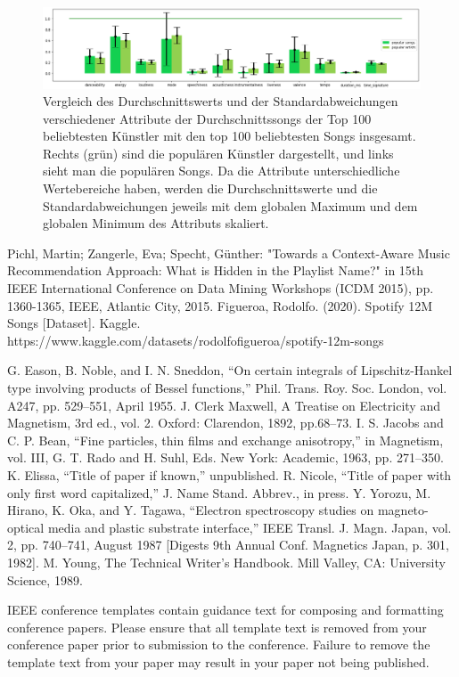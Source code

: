 \documentclass[conference]{IEEEtran}
\begin{document}
\begin{figure}[t]
\centering
\includegraphics[width=\textwidth]{images/tracks_arts.png}
\caption{Vergleich des Durchschnittswerts und der Standardabweichungen verschiedener Attribute der Durchschnittssongs der Top 100 beliebtesten Künstler mit den top 100 beliebtesten Songs insgesamt. Rechts (grün) sind die populären Künstler dargestellt, und links sieht man die populären Songs. Da die Attribute unterschiedliche Wertebereiche haben, werden die Durchschnittswerte und die Standardabweichungen jeweils mit dem globalen Maximum und dem globalen Minimum des Attributs skaliert.}
\label{popular artists vs popular songs}
\end{figure}


\begin{thebibliography}{00}
 Pichl, Martin; Zangerle, Eva; Specht, Günther: "Towards a Context-Aware Music Recommendation Approach: What is Hidden in the Playlist Name?" in 15th IEEE International Conference on Data Mining Workshops (ICDM 2015), pp. 1360-1365, IEEE, Atlantic City, 2015.
 Figueroa, Rodolfo. (2020). Spotify 12M Songs [Dataset]. Kaggle. https://www.kaggle.com/datasets/rodolfofigueroa/spotify-12m-songs

 G. Eason, B. Noble, and I. N. Sneddon, ``On certain integrals of Lipschitz-Hankel type involving products of Bessel functions,'' Phil. Trans. Roy. Soc. London, vol. A247, pp. 529--551, April 1955.
 J. Clerk Maxwell, A Treatise on Electricity and Magnetism, 3rd ed., vol. 2. Oxford: Clarendon, 1892, pp.68--73.
 I. S. Jacobs and C. P. Bean, ``Fine particles, thin films and exchange anisotropy,'' in Magnetism, vol. III, G. T. Rado and H. Suhl, Eds. New York: Academic, 1963, pp. 271--350.
 K. Elissa, ``Title of paper if known,'' unpublished.
 R. Nicole, ``Title of paper with only first word capitalized,'' J. Name Stand. Abbrev., in press.
 Y. Yorozu, M. Hirano, K. Oka, and Y. Tagawa, ``Electron spectroscopy studies on magneto-optical media and plastic substrate interface,'' IEEE Transl. J. Magn. Japan, vol. 2, pp. 740--741, August 1987 [Digests 9th Annual Conf. Magnetics Japan, p. 301, 1982].
 M. Young, The Technical Writer's Handbook. Mill Valley, CA: University Science, 1989.
\end{thebibliography}
\vspace{12pt}
\color{red}
IEEE conference templates contain guidance text for composing and formatting conference papers. Please ensure that all template text is removed from your conference paper prior to submission to the conference. Failure to remove the template text from your paper may result in your paper not being published.
\end{document}
